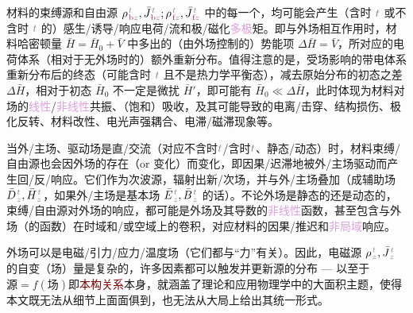 材料的束缚源和自由源 ${\rho}^{\;\!\mathcolor{gray}{t}}_{\;\!\textcolor{Maroon}{\text{b}}\mathcolor{gray}{z}}, \bar{J}^{\;\!\mathcolor{gray}{t}}_{\;\!\textcolor{Maroon}{\text{b}}\mathcolor{gray}{z}};{\rho}^{\;\!\mathcolor{gray}{t}}_{\;\!\textcolor{Maroon}{\text{f}}\mathcolor{gray}{z}}, \bar{J}^{\;\!\mathcolor{gray}{t}}_{\;\!\textcolor{Maroon}{\text{f}}\mathcolor{gray}{z}}$ 中的每一个，均可能会产生（含时 $\mathcolor{gray}{t}$ 或不含时 $\mathcolor{gray}{t}$ 的）感生/诱导/响应电荷/流\cite{markelExternalInducedFree2018,raabMultipoleTheoryElectromagnetism2004,tsukermanPolarizationArbitraryCharge2021a}和极/磁化\textcolor{Plum}{多极}矩。即与外场相互作用时，材料\textcolor{NavyBlue}{哈密顿量} $\bar{H} = \bar{H}_0 + \bar{V}$ 中多出的（由外场控制的）势能项 $\Delta \bar{H} = \bar{V}$\cite{boydNonlinearOptics2019,raabMultipoleTheoryElectromagnetism2004}，所对应的电荷体系（相对于无外场时的）额外重新分布。值得注意的是，受场影响的带电体系重新分布后的终态（可能含时 $\mathcolor{gray}{t}$ 且不是热力学平衡态），减去原始分布的初态之差 $\Delta \bar{H}$，相对于初态 $\bar{H}_0$ 不一定是\textcolor{NavyBlue}{微扰} $\bar{H}'$\cite{boydNonlinearOptics2019}，即可能有 $\bar{H}_0 \ll \Delta \bar{H}$，此时体现为材料对场的\textcolor{Plum}{线性}/\textcolor{Plum}{非线性}\textcolor{NavyBlue}{共振}、（饱和）\textcolor{NavyBlue}{吸收}，及其可能导致的电离/击穿\cite{boydNonlinearOptics2019}、结构损伤、极化反转、材料改性\cite{xuFemtosecondLaserWriting2022,weiExperimentalDemonstrationThreedimensional2018,xuThreedimensionalNonlinearPhotonic2018,keren-zurNewDimensionNonlinear2018}、电光声强耦合、电滞/磁滞现象等。

当外/主场、驱动场是直/交流（对应不含时$\mathcolor{gray}{t}$/含时$\mathcolor{gray}{t}$、静态/动态）时，材料束缚/自由源也会因外场的存在（or 变化）而变化，即因果/迟滞地被外/主场驱动而产生回/反/响应。它们作为次波源，辐射出新/次场，并与外/主场叠加（成\textcolor{NavyBlue}{辅助场} $\bar{D}^{\;\!\mathcolor{gray}{t}}_{\;\!\mathcolor{gray}{z}}, \bar{H}^{\;\!\mathcolor{gray}{t}}_{\;\!\mathcolor{gray}{z}}$，如果外/主场是\textcolor{NavyBlue}{基本场} $\bar{E}^{\;\!\mathcolor{gray}{t}}_{\;\!\mathcolor{gray}{z}}, \bar{B}^{\;\!\mathcolor{gray}{t}}_{\;\!\mathcolor{gray}{z}}$ 的话）。不论外场是静态的还是动态的，束缚/自由源对外场的响应，都可能是外场及其导数的\textcolor{Plum}{非线性}函数，甚至包含与外场（的函数）在时域和/或空域上的卷积，对应材料的因果/推迟和\textcolor{Plum}{非局域}响应。

外场可以是电磁/引力/应力/温度场（它们都与“力”有关）。因此，电磁源 ${\rho}^{\;\!\mathcolor{gray}{t}}_{\;\!\mathcolor{gray}{z}}, \bar{J}^{\;\!\mathcolor{gray}{t}}_{\;\!\mathcolor{gray}{z}}$ 的自变（场）量是复杂的，许多因素都可以触发并更新源的分布 --- 以至于$\text{源} = f(\text{场})$即\textcolor{Maroon}{本构关系}本身，就涵盖了理论和应用物理学中的大面积主题，使得本文既无法从细节上面面俱到，也无法从大局上给出其统一形式。

